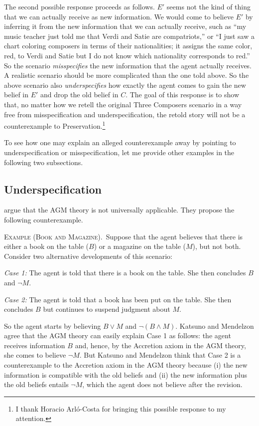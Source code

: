 The second possible response proceeds as follows. $E'$ seems not the kind of thing that we can actually receive as new information. We would come to believe $E'$ by inferring it from the new information that we can actually receive, such as ``my music teacher just told me that Verdi and Satie are compatriots,'' or ``I just saw a chart coloring composers in terms of their nationalities; it assigns the same color, red, to Verdi and Satie but I do not know which nationality corresponds to red.'' So the scenario {\em misspecifies} the new information that the agent actually receives. A realistic scenario should be more complicated than the one told above. So the above scenario also {\em underspecifies} how exactly the agent comes to gain the new belief in $E'$ and drop the old belief in $C$. The goal of this response is to show that, no matter how we retell the original Three Composers scenario in a way free from misspecification and underspecification, the retold story will not be a counterexample to Preservation.\footnote
{I thank Horacio Arl\'{o}-Costa for bringing this possible response to my attention.}  

To see how one may explain an alleged counterexample away by pointing to underspecification or misspecification, let me provide other examples in the following two subsections.


\subsection{Underspecification}

\citet*{katsuno2003difference} argue that the AGM theory is not universally applicable. They propose the following counterexample. \op

	\xm \textsc{Example (Book and Magazine).}\, Suppose that the agent believes that there is either a book on the table ($B$) or a magazine on the table ($M$), but not both. Consider two alternative developments of this scenario:

	{\em Case 1:} The agent is told that there is a book on the table. She then concludes $B$ and $\neg M$.

	{\em Case 2:} The agent is told that a book has been put on the table. She then concludes $B$ but continues to suspend judgment about $M$. 

\ed So the agent starts by believing $B \vee M$ and $\neg(B \wedge M)$. Katsuno and Mendelzon agree that the AGM theory can easily explain Case 1 as follows: the agent receives information $B$ and, hence, by the Accretion axiom in the AGM theory, she comes to believe $\neg M$. But Katsuno and Mendelzon think that Case 2 is a counterexample to the Accretion axiom in the AGM theory because (i) the new information is compatible with the old beliefs and (ii) the new information plus the old beliefs entails $\neg M$, which the agent does not believe after the revision.

